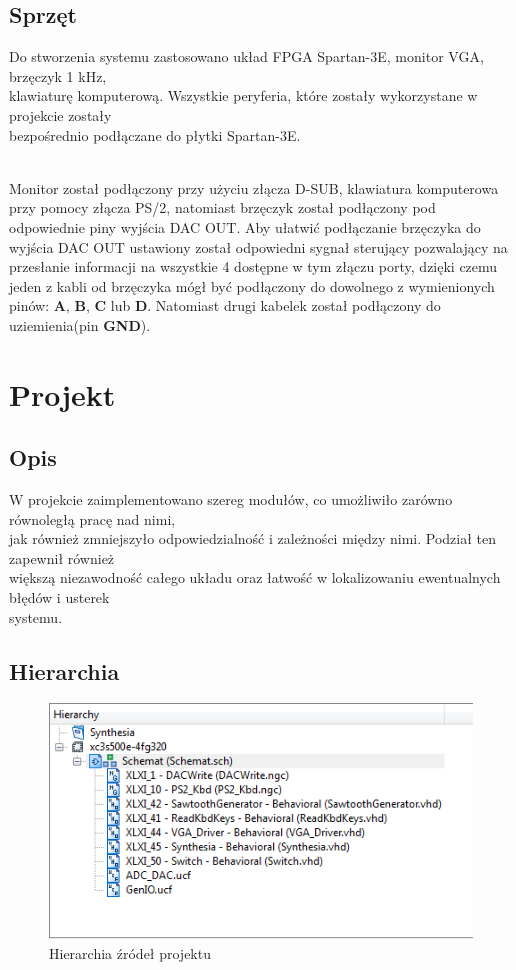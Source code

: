 \documentclass[a4paper]{report}
\begin{document}
	\section{Sprzęt}
		\par Do stworzenia systemu zastosowano układ FPGA Spartan-3E, 
		monitor VGA, brzęczyk 1 kHz, \\klawiaturę komputerową. Wszystkie peryferia, które zostały wykorzystane w projekcie
		zostały \\bezpośrednio podłączane do płytki Spartan-3E.\\\\
		\par Monitor został podłączony przy użyciu złącza D-SUB, 
		klawiatura komputerowa przy pomocy złącza PS/2, natomiast brzęczyk został podłączony pod odpowiednie piny wyjścia DAC OUT. Aby ułatwić 
		podłączanie brzęczyka do wyjścia DAC OUT ustawiony został odpowiedni sygnał sterujący pozwalający na przesłanie informacji na wszystkie 4 dostępne w tym 
		złączu porty, dzięki czemu jeden z kabli od brzęczyka mógł być podłączony do dowolnego z wymienionych pinów: \textbf{A},
		\textbf{B}, \textbf{C} lub \textbf{D}. Natomiast drugi kabelek został podłączony do uziemienia(pin \textbf{GND}).

\chapter{Projekt}
	\section{Opis}
	W projekcie zaimplementowano szereg modułów, co umożliwiło zarówno równoległą pracę nad nimi, \\jak również zmniejszyło odpowiedzialność i zależności między nimi. 
	Podział ten zapewnił również \\większą
	niezawodność całego układu oraz łatwość w lokalizowaniu ewentualnych błędów i 
	usterek \\systemu.
	\section{Hierarchia}
		\begin{figure}[h!]
			\centering
			\includegraphics{hierarchy.png}
			\caption{Hierarchia źródeł projektu}
		\end{figure}
				
\end{document}

